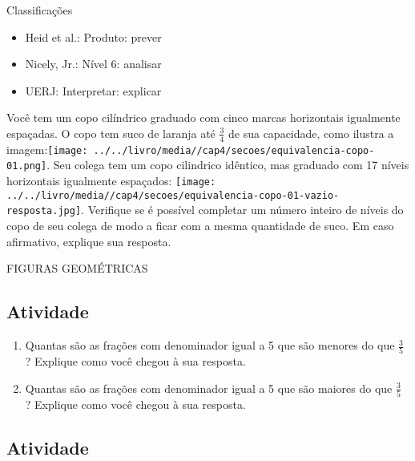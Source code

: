 \documentclass[a4,12pt]{book}
\begin{document}
Classificações
\begin{itemize} %
  \item     Heid et al.: Produto: prever
  \item     Nicely, Jr.: Nível 6: analisar
  \item     UERJ: Interpretar: explicar
\end{itemize} %



Você tem um copo cilíndrico graduado com cinco marcas horizontais igualmente espaçadas. O copo tem suco de laranja até $\frac{3}{4}$ de sua capacidade, como ilustra a imagem:\texttt{[image: ../../livro/media//cap4/secoes/equivalencia-copo-01.png]}. Seu colega tem um copo cilindrico idêntico, mas graduado com 17 níveis horizontais igualmente espaçados: \texttt{[image: ../../livro/media//cap4/secoes/equivalencia-copo-01-vazio-resposta.jpg]}.  
Verifique se é possível completar um número inteiro de níveis do copo de seu colega de modo a ficar com a mesma quantidade de suco. Em caso afirmativo, explique sua resposta.

\begin{imagem*}[breakable]{}{}   FIGURAS GEOMÉTRICAS\end{imagem*}






\subsection{Atividade}







\begin{enumerate} [\quad a)] %
  \item     Quantas são as frações com denominador igual a 5 que são menores do que     $\frac{3}{5}$    ? Explique como você chegou à sua resposta.
  \item     Quantas são as frações com denominador igual a 5 que são maiores do que     $\frac{3}{5}$    ? Explique como você chegou à sua resposta.
\end{enumerate} %







\subsection{Atividade}
\end{document}
